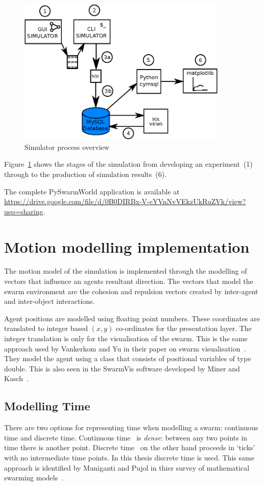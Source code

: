 \begin{figure}[H]
\begin{center}
\includegraphics[width=10cm]{CHAPTER-3/figures/SimulatorProcess}
\end{center}
\caption{Simulator process overview\label{sim:SimulatorOverview}}
\end{figure}

Figure~\ref{sim:SimulatorOverview} shows the stages of the simulation from developing an experiment~(1) through to the production of simulation results~(6).

The complete PySwarmWorld application is available at \url{https://drive.google.com/file/d/0B0DIRBx-V-eYVnNvVEkzUkRuZVk/view?usp=sharing}.

\section{Motion modelling implementation}
The motion model of the simulation is implemented through the modelling of vectors that influence an agents resultant direction. The vectors that model the swarm environment are the cohesion and repulsion vectors created by inter-agent and inter-object interactions. 

Agent positions are modelled using floating point numbers. These coordinates are translated to integer based $(x,y)$ co-ordinates for the presentation layer. The integer translation is only for the visualisation of the swarm. This is the same approach used by Vankerkom and Yu in their paper on swarm visualisation~\cite{VY:04}. They model the agent using a class that consists of positional variables of type double. This is also seen in the SwarmVis software developed by Miner and Kasch~\cite{DMNK:ND}.

\subsection{Modelling Time}\label{sim:time}
There are two options for representing time when modelling a swarm: continuous time and discrete time. Continuous time~\cite{HW:08} is \textit{dense}: between any two points in time there is another point. Discrete time~\cite{FAP:05, GP:05, RVMH:13, HER:11, MP:10, PCL:08a} on the other hand proceeds in `ticks' with no intermediate time points. In this thesis discrete time is used. This same approach is identified by Muniganti and Pujol in thier survey of mathematical swarming models~\cite{MP:10}. 

